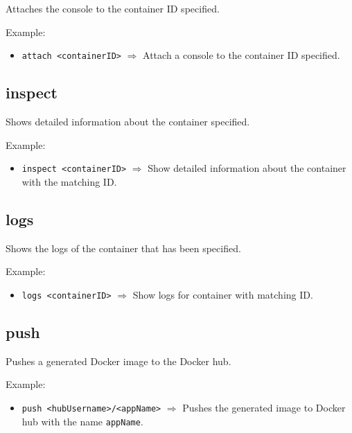 \documentclass[a4paper, 12pt]{article}
\begin{document}
Attaches the console to the container ID specified.

\vspace{0.5em}
Example:
\begin{itemize}
	\item \texttt{attach <containerID>} $\Rightarrow$ Attach a console to the
	container ID specified.
\end{itemize}

\subsection{inspect}

Shows detailed information about the container specified.

\vspace{0.5em}
Example:
\begin{itemize}
	\item \texttt{inspect <containerID>} $\Rightarrow$ Show detailed information
	about the container with the matching ID.
\end{itemize}

\subsection{logs}

Shows the logs of the container that has been specified.

\vspace{0.5em}
Example:
\begin{itemize}
	\item \texttt{logs <containerID>} $\Rightarrow$ Show logs for container
	with matching ID.
\end{itemize}

\subsection{push}

Pushes a generated Docker image to the Docker hub.

\vspace{0.5em}
Example:
\begin{itemize}
	\item \texttt{push <hubUsername>/<appName>} $\Rightarrow$ Pushes the
	generated image to Docker hub with the name \texttt{appName}.
\end{itemize}
\end{document}
